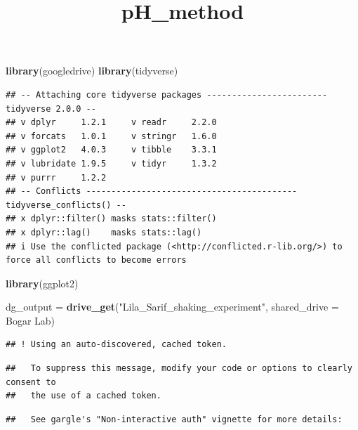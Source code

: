 \documentclass[
]{article}
\title{pH\_method}
\author{}
\date{\vspace{-2.5em}}
\newenvironment{Shaded}{\begin{snugshade}}{\end{snugshade}}
\newcommand{\AttributeTok}[1]{\textcolor[rgb]{0.13,0.29,0.53}{#1}}
\newcommand{\FunctionTok}[1]{\textcolor[rgb]{0.13,0.29,0.53}{\textbf{#1}}}
\newcommand{\NormalTok}[1]{#1}
\newcommand{\OtherTok}[1]{\textcolor[rgb]{0.56,0.35,0.01}{#1}}
\newcommand{\StringTok}[1]{\textcolor[rgb]{0.31,0.60,0.02}{#1}}
\begin{document}
\maketitle

\begin{Shaded}
\begin{Highlighting}[]
\FunctionTok{library}\NormalTok{(googledrive)}
\FunctionTok{library}\NormalTok{(tidyverse)}
\end{Highlighting}
\end{Shaded}

\begin{verbatim}
## -- Attaching core tidyverse packages ------------------------ tidyverse 2.0.0 --
## v dplyr     1.2.1     v readr     2.2.0
## v forcats   1.0.1     v stringr   1.6.0
## v ggplot2   4.0.3     v tibble    3.3.1
## v lubridate 1.9.5     v tidyr     1.3.2
## v purrr     1.2.2     
## -- Conflicts ------------------------------------------ tidyverse_conflicts() --
## x dplyr::filter() masks stats::filter()
## x dplyr::lag()    masks stats::lag()
## i Use the conflicted package (<http://conflicted.r-lib.org/>) to force all conflicts to become errors
\end{verbatim}

\begin{Shaded}
\begin{Highlighting}[]
\FunctionTok{library}\NormalTok{(ggplot2)}
\end{Highlighting}
\end{Shaded}

\begin{Shaded}
\begin{Highlighting}[]
\NormalTok{dg\_output }\OtherTok{=} \FunctionTok{drive\_get}\NormalTok{(}\StringTok{"Lila\_Sarif\_shaking\_experiment"}\NormalTok{, }\AttributeTok{shared\_drive =} \StringTok{\textquotesingle{}Bogar Lab\textquotesingle{}}\NormalTok{)}
\end{Highlighting}
\end{Shaded}

\begin{verbatim}
## ! Using an auto-discovered, cached token.
\end{verbatim}

\begin{verbatim}
##   To suppress this message, modify your code or options to clearly consent to
##   the use of a cached token.
\end{verbatim}

\begin{verbatim}
##   See gargle's "Non-interactive auth" vignette for more details:
\end{verbatim}
\end{document}
